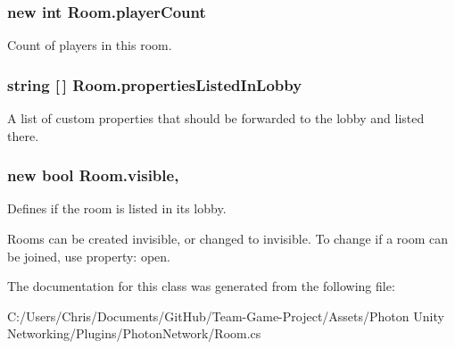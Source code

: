 \subsubsection[{\texorpdfstring{player\+Count}{playerCount}}]{\setlength{\rightskip}{0pt plus 5cm}new int Room.\+player\+Count\hspace{0.3cm}{\ttfamily [get]}}\hypertarget{class_room_aa9d85e54b2ff1b151de3670e87549966}{}\label{class_room_aa9d85e54b2ff1b151de3670e87549966}


Count of players in this room.

\subsubsection[{\texorpdfstring{properties\+Listed\+In\+Lobby}{propertiesListedInLobby}}]{\setlength{\rightskip}{0pt plus 5cm}string \mbox{[}$\,$\mbox{]} Room.\+properties\+Listed\+In\+Lobby\hspace{0.3cm}{\ttfamily [get]}}\hypertarget{class_room_a9f4957e84aefcd801a35a63f44ce42f3}{}\label{class_room_a9f4957e84aefcd801a35a63f44ce42f3}


A list of custom properties that should be forwarded to the lobby and listed there. 

\subsubsection[{\texorpdfstring{visible}{visible}}]{\setlength{\rightskip}{0pt plus 5cm}new bool Room.\+visible\hspace{0.3cm}{\ttfamily [get]}, {\ttfamily [set]}}\hypertarget{class_room_a8792cdddd5a4b8933bea7adab8438edf}{}\label{class_room_a8792cdddd5a4b8933bea7adab8438edf}


Defines if the room is listed in its lobby. 

Rooms can be created invisible, or changed to invisible. To change if a room can be joined, use property\+: open. 

The documentation for this class was generated from the following file\+:\begin{DoxyCompactItemize}
\item 
C\+:/\+Users/\+Chris/\+Documents/\+Git\+Hub/\+Team-\/\+Game-\/\+Project/\+Assets/\+Photon Unity Networking/\+Plugins/\+Photon\+Network/Room.\+cs\end{DoxyCompactItemize}
